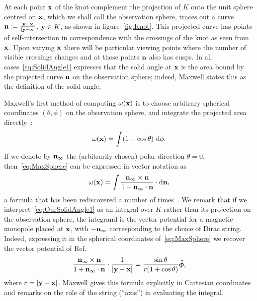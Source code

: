     At each point ${\bf x}$ of the knot complement the projection of $K$ onto the unit sphere centred on ${\bf x}$, which we shall call the observation sphere, traces out a curve ${\bf n}:=\frac{{\bf y}-{\bf x}}{|{\bf y}-{\bf x}|}$, ${\bf y}\in K$, as shown in figure~\ref{fig:Knot}. This projected curve has points of self-intersection in correspondence with the crossings of the knot as seen from ${\bf x}$. Upon varying ${\bf x}$ there will be particular viewing points where the number of visible crossings changes and at those points ${\bf n}$ also has cusps. In all cases~\eqref{eq:SolidAngle1} expresses that the solid angle at ${\bf x}$ is the area bound by the projected curve ${\bf n}$ on the observation sphere; indeed, Maxwell states this as the definition of the solid angle. 

    Maxwell's first method of computing $\omega({\bf x})$ is to choose arbitrary spherical coordinates $(\theta,\phi)$ on the observation sphere, and integrate the projected area directly~\citep[Art.~417]{Maxwell2}:
    \begin{equation}
        \omega({\bf x}) = \int (1 - \cos \theta)~\mathrm{d}\phi .
        \label{eq:MaxSphere}
    \end{equation}
    If we denote by ${\bf n}_{\infty}$ the (arbitrarily chosen) polar direction $\theta=0$, then~\eqref{eq:MaxSphere} can be expressed in vector notation as 
    \begin{equation}
        \omega({\bf x}) = \int \frac{{\bf n}_{\infty} \times {\bf n} }{1+{\bf n}_\infty \cdot {\bf n}} \cdot \mathrm{d}{\bf n} ,
        \label{eq:OurSolidAngle1}
    \end{equation}
    a formula that has been rediscovered a number of times~\citep{Asvestas1985,Dangskul2015,Borodzik2017}. We remark that if we interpret~\eqref{eq:OurSolidAngle1} as an integral over $K$ rather than its projection on the observation sphere, the integrand is the vector potential for a magnetic monopole placed at ${\bf x}$, with $-{\bf n}_{\infty}$ corresponding to the choice of Dirac string. Indeed, expressing it in the spherical coordinates of~\eqref{eq:MaxSphere} we recover the vector potential of Ref.~\citep{Dirac1931}
    \begin{equation}
        \frac{{\bf n}_{\infty} \times {\bf n} }{1+{\bf n}_\infty \cdot {\bf n}} \cdot \frac{1}{| \bf {y - x} |} = \frac{\sin{\theta}}{r(1+\cos{\theta})}\boldsymbol{\hat{\phi}}, 
    \end{equation}
    where $r = |{\bf y -x}|$. Maxwell gives this formula explicitly in Cartesian coordinates and remarks on the role of the string (``axis'') in evaluating the integral. 

